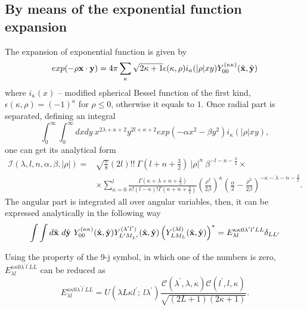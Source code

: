 \documentclass[
12pt, %
oneside, %
english, %
onehalfspacing, %
onehalfspacing, %
headsepline, %
]{MastersDoctoralThesis} %
\begin{document}
\subsection{By means of the  exponential function expansion}
\label{overlap_by_exp}
The expansion of exponential function is given by 
\begin{equation}
exp(-\rho {\bf x} \cdot {\bf y}) = 4 \pi \sum_{\kappa} \sqrt{2\kappa+1} 
\epsilon(\kappa, \rho)i_{\kappa}(|\rho|xy)Y_{00}^{(\kappa\kappa)}(\hat{{\bf x}},\hat{{\bf y}})
\label{exponent_expantion}
\end{equation} 
where $i_{\kappa}(x) $ -- modified spherical Bessel function of the first kind, $\epsilon(\kappa, \rho)=(-1)^{\kappa}$ for $\rho \le 0$, otherwise it equals to $1$.
Once radial part is separated, defining an integral
\begin{equation}
\int_0^\infty \int_0^\infty  dx dy~ x^{2\lambda+\kappa+2}y^{2 l +\kappa+2} exp\left( -\alpha x^2 - \beta y^2 \right) i_{\kappa}(|\rho|xy),
\end{equation}
one can get its analytical form
\begin{align}
\mathcal{I}(\lambda, l, n, \alpha, \beta, |\rho|) =& \sqrt{\frac{\pi}{8}}(2l)!!~ \Gamma(l+n+\tfrac{3}{2})~|\rho|^{n} ~\beta^{-l-n-\tfrac{3}{2}} \times \nonumber \\
& \times \sum_{\kappa=0}^{l} \frac{\Gamma(\kappa+\lambda+n+\tfrac{3}{2})}{\kappa! (l-\kappa)! \Gamma(\kappa+n+\tfrac{3}{2})}
\left(\frac{\rho^2}{2\beta}\right)^{\kappa} \left( \frac{\alpha}{2} - \frac{\rho^2}{2\beta}  \right)^{-\kappa-\lambda-n-\tfrac{3}{2}}.
\label{overlap1}
\end{align}
The angular part is integrated all over angular variables, then,  it can be expressed analytically in the following way
\begin{align}
\int \int d\hat{\bf x}~d\hat{\bf y}~ Y_{00}^{(\kappa\kappa)}(\hat{{\bf x}},\hat{{\bf y}})  Y_{L^{\prime}M_{L^{\prime}}}^{(\lambda^{\prime} l^{\prime})}(\hat{{\bf x}},\hat{{\bf y}}) \left(  Y_{LM_L}^{(\lambda l)}(\hat{{\bf x}},\hat{{\bf y}}) \right)^{*} =  {E}^{\kappa \kappa 0 \lambda^{\prime} l^{\prime} L L}_{\lambda l} \delta_{LL^{\prime}} 
\label{angular_part_overlap1}
\end{align}

Using the property of the 9-j symbol, in which one of the numbers is zero, ${E}^{\kappa \kappa 0 \lambda^{\prime} l^{\prime} L L}_{\lambda l}$ can be reduced as
\begin{equation}
{E}^{\kappa \kappa 0 \lambda^{\prime} l^{\prime} L L}_{\lambda l}
=U\left(  \lambda L \kappa l^{\prime};~ l \lambda^{\prime} \right) \frac{\mathcal{C} \left( \lambda^{\prime}, \lambda, \kappa \right) \mathcal{C} \left( l^{\prime}, l, \kappa \right) }{ \sqrt{\left( 2L+1 \right) \left( 2\kappa +1 \right)}}.
\end{equation}
\end{document}
